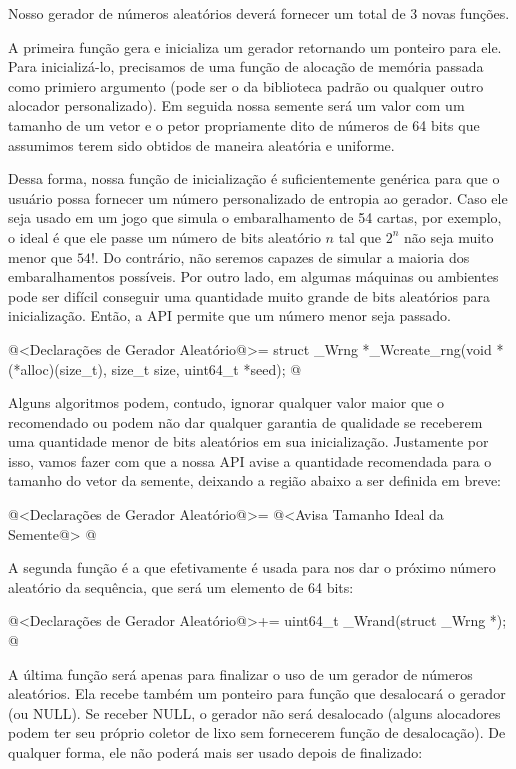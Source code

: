 
Nosso gerador de números aleatórios deverá fornecer um total de 3
novas funções.

A primeira função gera e inicializa um gerador retornando um ponteiro
para ele. Para inicializá-lo, precisamos de uma função de alocação de
memória passada como primiero argumento (pode ser o  da
biblioteca padrão ou qualquer outro alocador personalizado). Em
seguida nossa semente será um valor com um tamanho de um vetor e o
petor propriamente dito de números de 64 bits que assumimos terem sido
obtidos de maneira aleatória e uniforme.

Dessa forma, nossa função de inicialização é suficientemente genérica
para que o usuário possa fornecer um número personalizado de entropia
ao gerador. Caso ele seja usado em um jogo que simula o embaralhamento
de 54 cartas, por exemplo, o ideal é que ele passe um número de bits
aleatório $n$ tal que $2^n$ não seja muito menor que $54!$. Do
contrário, não seremos capazes de simular a maioria dos
embaralhamentos possíveis. Por outro lado, em algumas máquinas ou
ambientes pode ser difícil conseguir uma quantidade muito grande de
bits aleatórios para inicialização. Então, a API permite que um número
menor seja passado.

\iniciocodigo
@<Declarações de Gerador Aleatório@>=
struct _Wrng *_Wcreate_rng(void *(*alloc)(size_t), size_t size, uint64_t *seed);
@
\fimcodigo

Alguns algoritmos podem, contudo, ignorar qualquer valor maior que o
recomendado ou podem não dar qualquer garantia de qualidade se
receberem uma quantidade menor de bits aleatórios em sua
inicialização. Justamente por isso, vamos fazer com que a nossa API
avise a quantidade recomendada para o tamanho do vetor da semente,
deixando a região abaixo a ser definida em breve:

\iniciocodigo
@<Declarações de Gerador Aleatório@>=
@<Avisa Tamanho Ideal da Semente@>
@
\fimcodigo


A segunda função é a que efetivamente é usada para nos dar o próximo
número aleatório da sequência, que será um elemento de 64 bits:

\iniciocodigo
@<Declarações de Gerador Aleatório@>+=
uint64_t _Wrand(struct _Wrng *);
@
\fimcodigo

A última função será apenas para finalizar o uso de um gerador de
números aleatórios. Ela recebe também um ponteiro para função que
desalocará o gerador (ou NULL). Se receber NULL, o gerador não será
desalocado (alguns alocadores podem ter seu próprio coletor de lixo
sem fornecerem função de desalocação). De qualquer forma, ele não
poderá mais ser usado depois de finalizado:

